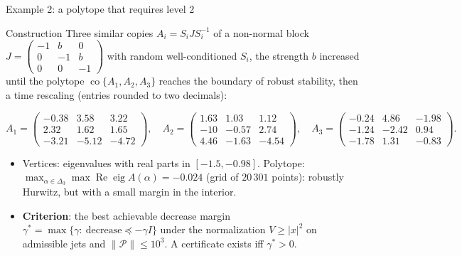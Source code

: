 \documentclass[10pt,aspectratio=169]{beamer}
\newcommand{\PP}{\mathcal{P}}
\DeclareMathOperator{\co}{co}
\begin{document}
\begin{frame}{Example 2: a polytope that requires level $2$}
\begin{block}{Construction}
Three similar copies $A_i=S_iJS_i^{-1}$ of a non-normal block $J=\begin{pmatrix}-1&b&0\\0&-1&b\\0&0&-1\end{pmatrix}$ with random well-conditioned $S_i$, the strength $b$ increased until the polytope $\co\{A_1,A_2,A_3\}$ reaches the boundary of robust stability, then a time rescaling (entries rounded to two decimals):
\end{block}
\[
A_1=\begin{pmatrix}-0.38&3.58&3.22\\2.32&1.62&1.65\\-3.21&-5.12&-4.72\end{pmatrix},\quad
A_2=\begin{pmatrix}1.63&1.03&1.12\\-10&-0.57&2.74\\4.46&-1.63&-4.54\end{pmatrix},\quad
A_3=\begin{pmatrix}-0.24&4.86&-1.98\\-1.24&-2.42&0.94\\-1.78&1.31&-0.83\end{pmatrix}.
\]
\begin{itemize}
\item Vertices: eigenvalues with real parts in $[-1.5,-0.98]$. Polytope: $\max_{\alpha\in\Delta_3}\max\operatorname{Re}\operatorname{eig}A(\alpha)=-0.024$ (grid of $20\,301$ points): robustly Hurwitz, but with a small margin in the interior.
\item \textbf{Criterion}: the best achievable decrease margin $\gamma^*=\max\{\gamma:\ \text{decrease}\preceq-\gamma I\}$ under the normalization $V\ge|x|^2$ on admissible jets and $\|\PP\|\le10^3$. A certificate exists iff $\gamma^*>0$.
\end{itemize}
\end{frame}
\end{document}
